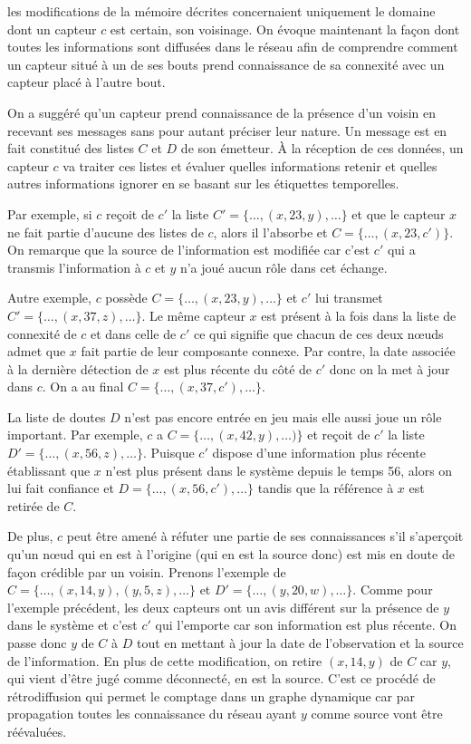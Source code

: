\documentclass[10pt]{article}
\begin{document}
\begin{multicols}{2}
les modifications de la mémoire décrites concernaient uniquement le
domaine dont un capteur $c$ est certain, son voisinage. On évoque
maintenant la façon dont toutes les informations sont diffusées dans
le réseau afin de comprendre comment un capteur situé à un de ses
bouts prend connaissance de sa connexité avec un capteur placé à
l'autre bout.

On a suggéré qu'un capteur prend connaissance de la présence d'un
voisin en recevant ses messages sans pour autant préciser leur
nature. Un message est en fait constitué des listes $C$ et $D$ de son
émetteur. \`A la réception de ces données, un capteur $c$ va traiter
ces listes et évaluer quelles informations retenir et quelles autres
informations ignorer en se basant sur les étiquettes temporelles.

Par exemple, si $c$ reçoit de $c'$ la liste $C' =
\{\dots,(x,23,y),\dots\}$ et que le capteur $x$ ne fait partie
d'aucune des listes de $c$, alors il l'absorbe et $C =
\{\dots,(x,23,c')\}$. On remarque que la source de l'information est
modifiée car c'est $c'$ qui a transmis l'information à $c$ et $y$ n'a
joué aucun rôle dans cet échange.

Autre exemple, $c$ possède $C = \{\dots,(x,23,y),\dots\}$ et $c'$ lui
transmet $C' = \{\dots,(x,37,z),\dots\}$. Le même capteur $x$ est
présent à la fois dans la liste de connexité de $c$ et dans celle de
$c'$ ce qui signifie que chacun de ces deux n\oe uds admet que $x$
fait partie de leur composante connexe. Par contre, la date associée à
la dernière détection de $x$ est plus récente du côté de $c'$ donc on
la met à jour dans $c$. On a au final $C = \{\dots,(x,37,c'),\dots\}$.

La liste de doutes $D$ n'est pas encore entrée en jeu mais elle aussi
joue un rôle important. Par exemple, $c$ a $C =
\{\dots,(x,42,y),\dots)\}$ et reçoit de $c'$ la liste $D' =
\{\dots,(x,56,z),\dots\}$. Puisque $c'$ dispose d'une information plus
récente établissant que $x$ n'est plus présent dans le système depuis
le temps 56, alors on lui fait confiance et $D =
\{\dots,(x,56,c'),\dots\}$ tandis que la référence à $x$ est retirée
de $C$.

De plus, $c$ peut être amené à réfuter une partie de ses connaissances
s'il s'aperçoit qu'un n\oe ud qui en est à l'origine (qui en est la
source donc) est mis en doute de façon crédible par un voisin. Prenons
l'exemple de $C = \{\dots,(x,14,y),(y,5,z),\dots\}$ et $D' =
\{\dots,(y,20,w),\dots\}$. Comme pour l'exemple précédent, les deux
capteurs ont un avis différent sur la présence de $y$ dans le système
et c'est $c'$ qui l'emporte car son information est plus récente. On
passe donc $y$ de $C$ à $D$ tout en mettant à jour la date de
l'observation et la source de l'information. En plus de cette
modification, on retire $(x,14,y)$ de $C$ car $y$, qui vient d'être
jugé comme déconnecté, en est la source. C'est ce procédé de
rétrodiffusion qui permet le comptage dans un graphe dynamique car par
propagation toutes les connaissance du réseau ayant $y$ comme source
vont être réévaluées.


\end{multicols}
\end{document}
